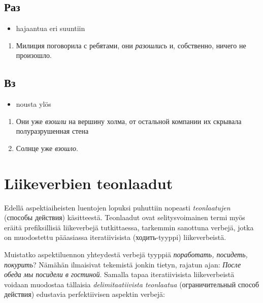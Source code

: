 \documentclass[]{scrreprt}
\providecommand{\tightlist}{%
  \setlength{\itemsep}{0pt}\setlength{\parskip}{0pt}}
\begin{document}
\subsection{Раз}\label{ux440ux430ux437}

\begin{itemize}
\tightlist
\item
  hajaantua eri suuntiin
\end{itemize}

\begin{enumerate}
\def\labelenumi{(\arabic{enumi})}
\setcounter{enumi}{443}
\tightlist
\item
  Милиция поговорила с ребятами, они \emph{разошлись} и, собственно,
  ничего не произошло.
\end{enumerate}

\subsection{Вз}\label{ux432ux437}

\begin{itemize}
\tightlist
\item
  nousta ylös
\end{itemize}

\begin{enumerate}
\def\labelenumi{(\arabic{enumi})}
\setcounter{enumi}{444}
\tightlist
\item
  Они уже \emph{взошли} на вершину холма, от остальной компании их
  скрывала полуразрушенная стена
\item
  Солнце уже \emph{взошло}.
\end{enumerate}

\section{Liikeverbien teonlaadut}\label{liikeverbien-teonlaadut}

Edellä aspektiaiheisten luentojen lopuksi puhuttiin nopeasti
\emph{teonlaatujen} (способы действия) käsitteestä. Teonlaadut ovat
selitysvoimainen termi myös eräitä prefiksillisiä liikeverbejä
tutkittaessa, tarkemmin sanottuna verbejä, jotka on muodostettu
pääasiassa iteratiivisista (ходить-tyyppi) liikeverbeistä.

Muistatko aspektiluennon yhteydestä verbejä tyyppiä \emph{поработать,
посидеть, покурить}? Nämähän ilmaisivat tekemistä jonkin tietyn, rajatun
ajan: \emph{После обеда мы посидели в гостиной}. Samalla tapaa
iteratiivisista liikeverbeistä voidaan muodostaa tällaisia
\emph{delimitaatiivista teonlaatua} (ограничительный способ действия)
edustavia perfektiivisen aspektin verbejä:
\end{document}
